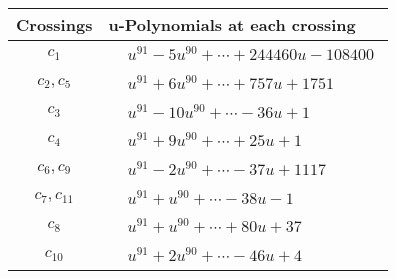 \documentclass[1p]{elsarticle_modified}
\theoremstyle{definition}
\begin{document}
\begin{tabular}{m{50pt}|m{274pt}}
Crossings & \hspace{64pt}u-Polynomials at each crossing \\
\hline $$\begin{aligned}c_{1}\end{aligned}$$&$\begin{aligned}
&u^{91}-5 u^{90}+\cdots+244460 u-108400
\end{aligned}$\\
\hline $$\begin{aligned}c_{2},c_{5}\end{aligned}$$&$\begin{aligned}
&u^{91}+6 u^{90}+\cdots+757 u+1751
\end{aligned}$\\
\hline $$\begin{aligned}c_{3}\end{aligned}$$&$\begin{aligned}
&u^{91}-10 u^{90}+\cdots-36 u+1
\end{aligned}$\\
\hline $$\begin{aligned}c_{4}\end{aligned}$$&$\begin{aligned}
&u^{91}+9 u^{90}+\cdots+25 u+1
\end{aligned}$\\
\hline $$\begin{aligned}c_{6},c_{9}\end{aligned}$$&$\begin{aligned}
&u^{91}-2 u^{90}+\cdots-37 u+1117
\end{aligned}$\\
\hline $$\begin{aligned}c_{7},c_{11}\end{aligned}$$&$\begin{aligned}
&u^{91}+u^{90}+\cdots-38 u-1
\end{aligned}$\\
\hline $$\begin{aligned}c_{8}\end{aligned}$$&$\begin{aligned}
&u^{91}+u^{90}+\cdots+80 u+37
\end{aligned}$\\
\hline $$\begin{aligned}c_{10}\end{aligned}$$&$\begin{aligned}
&u^{91}+2 u^{90}+\cdots-46 u+4
\end{aligned}$\\
\hline
\end{tabular}\\~\\
\end{document}

